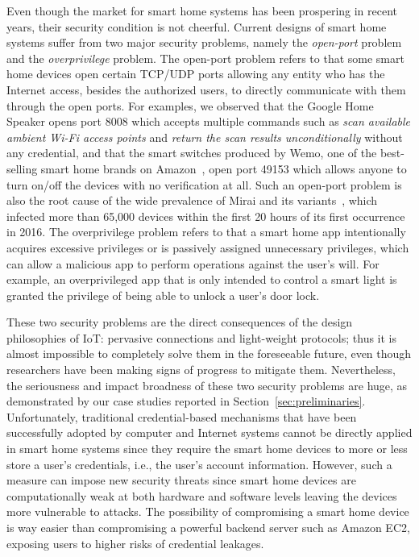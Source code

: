\documentclass[letterpaper,12pt]{article}
\begin{document}
Even though the market for smart home systems has been prospering in recent years, their security condition is not cheerful. Current designs of smart home systems suffer from two major security problems, namely the \emph{open-port} problem and the \emph{overprivilege} problem. The open-port problem refers to that some smart home devices open certain TCP/UDP ports allowing any entity who has the Internet access, besides the authorized users, to directly communicate with them through the open ports. For examples, we observed that the Google Home Speaker opens port 8008 which accepts multiple commands such as \emph{scan available ambient Wi-Fi access points} and \emph{return the scan results unconditionally} without any credential, and that the smart switches produced by Wemo, one of the best-selling smart home brands on Amazon~\cite{bestselling}, open port 49153 which allows anyone to turn on/off the devices with no verification at all. Such an open-port problem is also the root cause of the wide prevalence of Mirai and its variants~\cite{antonakakis2017understanding}, which infected more than 65,000 devices within the first 20 hours of its first occurrence in 2016. The overprivilege problem refers to that a smart home app intentionally acquires excessive privileges or is passively assigned unnecessary privileges, which can allow a malicious app to perform operations against the user's will. For example, an overprivileged app that is only intended to control a smart light is granted the privilege of being able to unlock a user's door lock. 

These two security problems are the direct consequences of the design philosophies of IoT: pervasive connections and light-weight protocols; thus it is almost impossible to completely solve them in the foreseeable future, even though researchers have been making signs of progress to mitigate them. Nevertheless, the seriousness and impact broadness of these two security problems are huge, as demonstrated by our case studies reported in Section~\ref{sec:preliminaries}. Unfortunately, traditional credential-based mechanisms that have been successfully adopted by computer and Internet systems cannot be directly applied in smart home systems since they require the smart home devices to more or less store a user's credentials, i.e., the user's account information. However, such a measure can impose new security threats since smart home devices are computationally weak at both hardware and software levels leaving the devices more vulnerable to attacks. The possibility of compromising a smart home device is way easier than compromising a powerful backend server such as Amazon EC2, exposing users to higher risks of credential leakages.
\end{document}
